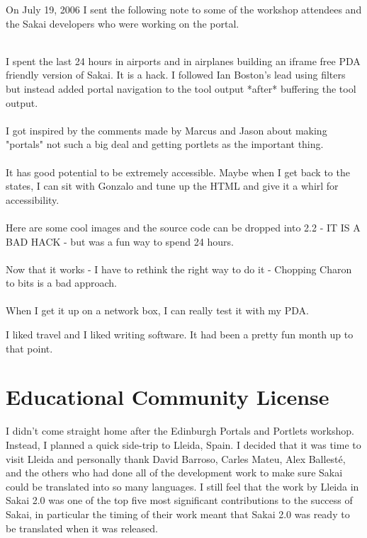 \documentclass[12pt]{book}
\begin{document}
On July 19, 2006 I sent the following note to some of
the workshop attendees and the Sakai developers who
were working on the portal.\\
\\
\begin{sf}
I spent the last 24 hours in airports and in
airplanes building an iframe free PDA friendly version
of Sakai.  It is a hack.  I followed Ian Boston's
lead using filters but instead added portal navigation
to the tool output *after* buffering the tool output.\\
\\
I got inspired by the comments made by Marcus and
Jason about making "portals" not such a big deal
and getting portlets as the important thing.\\
\\
It has good potential to be extremely accessible.
Maybe when I get back to the states, I can sit with
Gonzalo and tune up the HTML and give it a whirl
for accessibility.\\
\\
Here are some cool images and the source code can be dropped
into 2.2 - IT IS A BAD HACK - but was a fun way to
spend 24 hours.\\
\\
Now that it works - I have to rethink the right way to
do it - Chopping Charon to bits is a bad approach.\\
\\
When I get it up on a network box, I can really test
it with my PDA.\\
\end{sf}

I liked travel and I liked writing software.  It had been
a pretty fun month up to that point.

\chapter{Educational Community License}

I didn't come straight home after the Edinburgh Portals
and Portlets workshop.  Instead, I planned a quick side-trip
to Lleida, Spain.  I decided that it was time to visit Lleida
and personally thank David Barroso, Carles Mateu, Alex Ballest\'{e}, and the
others who had done all of the development work to make sure
Sakai could be translated into so many languages.  I still
feel that the work by Lleida in Sakai 2.0 was one of the
top five most significant contributions to the success of Sakai,
in particular the timing of their work meant that
Sakai 2.0 was ready to be translated when it was released.
\end{document}
